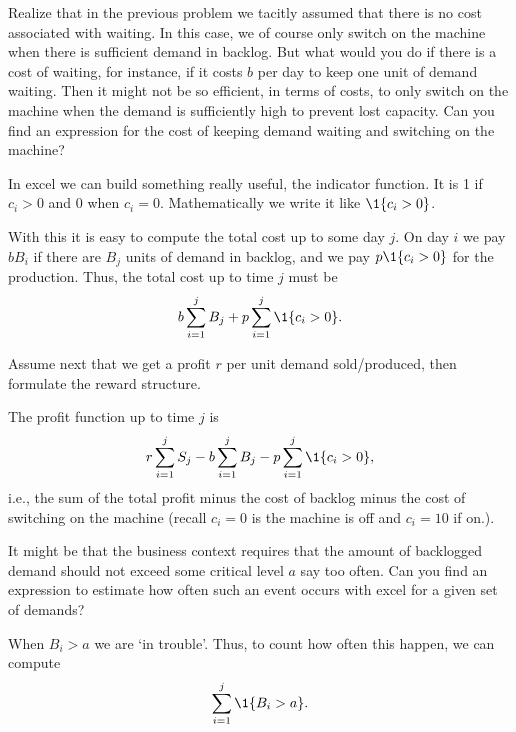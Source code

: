 \begin{question}
  Realize that in the previous problem we tacitly assumed that there
  is no cost associated with waiting.  In this case, we of course only
  switch on the machine when there is sufficient demand in
  backlog. But what would you do if there is a cost of waiting, for
  instance, if it costs $b$ per day to keep one unit of demand
  waiting. Then it might not be so efficient, in terms of costs, to
  only switch on the machine when the demand is sufficiently high to
  prevent lost capacity. Can you find an expression for the cost of
  keeping demand waiting and switching on the machine?
  \begin{solution}
    In excel we can build something really useful, the indicator
    function. It is 1 if $c_i>0$ and $0$ when $c_i=0$. Mathematically
    we write it like $\1{c_i>0}$.  

    With this it is easy to compute the total cost up to some day
    $j$. On day $i$ we pay $b B_i$ if there are $B_j$ units of demand
    in backlog, and we pay $p \1{c_i>0}$ for the production. Thus,  the total cost up to time $j$ must be 
    \begin{equation*}
      b\sum_{i=1}^j B_j + p \sum_{i=1}^j \1{c_i > 0}.
    \end{equation*}

  \end{solution}
\end{question}

\begin{question}
  Assume next that we get a profit $r$ per unit demand sold/produced, then
formulate the reward structure.
  \begin{solution}
    The profit function up to time $j$ is
    \begin{equation*}
     r \sum_{i=1}^j S_j - b \sum_{i=1}^j B_j - p \sum_{i=1}^j \1{c_i>0}, 
    \end{equation*}
    i.e., the sum of the total profit minus the cost of backlog minus
    the cost of switching on the machine (recall $c_i = 0$ is the
    machine is off and $c_i = 10$ if on.).

  \end{solution}
\end{question}

\begin{question}
  It might be that the business context requires that the amount of
  backlogged demand should not exceed some critical level $a$ say too
  often. Can you find an expression to estimate how often such an
  event occurs with excel for a given set of demands?
  \begin{solution}
    When $B_i>a$ we are `in trouble'. Thus, to count how often this happen, we can compute
    \begin{equation*}
      \sum_{i=1}^j \1{B_i > a}.
    \end{equation*}
  \end{solution}
\end{question}

